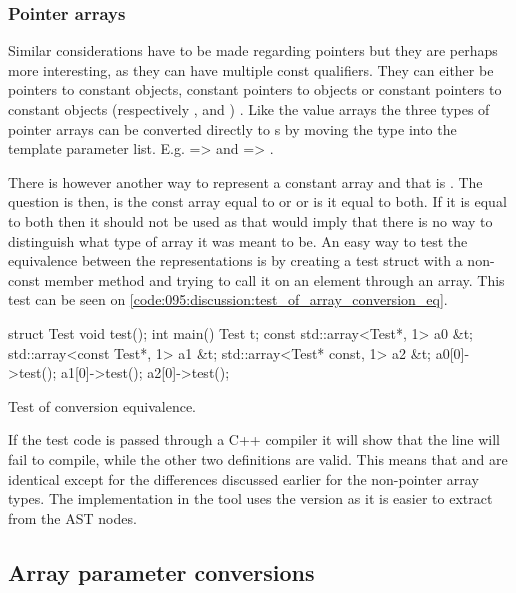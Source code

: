 \subsubsection*{Pointer arrays}
Similar considerations have to be made regarding pointers but they are perhaps more interesting, as they can have multiple const qualifiers.
They can either be pointers to constant objects, constant pointers to objects or constant pointers to constant objects (respectively ,  and ) \cite{cppreferencePointerDeclarationCppreference}.
Like the value arrays the three types of pointer arrays can be converted directly to s by moving the type into the template parameter list. E.g.  =>  and  => .

There is however another way to represent a constant array and that is . The question is then, is the const array equal to  or  or is it equal to both. If it is equal to both then it should not be used as that would imply that there is no way to distinguish what type of array it was meant to be. An easy way to test the equivalence between the representations is by creating a test struct with a non-const member method and trying to call it on an element through an array. This test can be seen on \cref{code:095:discussion:test_of_array_conversion_eq}.

\begin{listing}[H]
    \begin{cppcode}
struct Test {void test(){}};
int main() {
    Test t;
    const std::array<Test*, 1> a0 {&t};
    std::array<const Test*, 1> a1 {&t};
    std::array<Test* const, 1> a2 {&t};
    a0[0]->test();
    a1[0]->test();
    a2[0]->test();
}
    \end{cppcode}
    \caption{Test of conversion equivalence.}
    \label{code:095:discussion:test_of_array_conversion_eq}
\end{listing}

If the test code is passed through a C++ compiler it will show that the  line will fail to compile, while the other two definitions are valid. This means that  and  are identical except for the differences discussed earlier for the non-pointer array types. The implementation in the tool uses the  version as it is easier to extract from the AST nodes.

\subsection{Array parameter conversions}\label{subsec:095disc:arrayParm}


